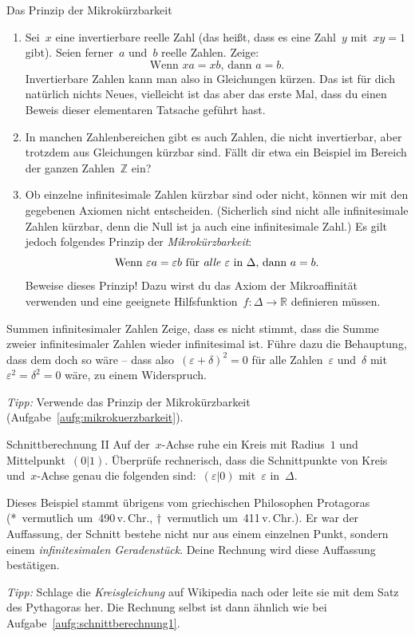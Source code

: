 \documentclass{zirkelblatt}
\newcommand{\ZZ}{\mathbb{Z}}
\newcommand{\RR}{\mathbb{R}}
\theoremstyle{definition}
\theoremstyle{plain}
\theoremstyle{remark}
\begin{document}
\begin{aufgabeShaded}{Das Prinzip der Mikrokürzbarkeit}
\label{aufg:mikrokuerzbarkeit}
\begin{enumerate}
\item Sei~$x$ eine invertierbare reelle Zahl (das heißt, dass es eine Zahl~$y$
mit~$xy = 1$ gibt). Seien ferner~$a$ und~$b$ reelle Zahlen. Zeige:
\[ \text{Wenn $xa = xb$, dann $a = b$.} \]
Invertierbare Zahlen kann man also in Gleichungen kürzen. Das ist für dich
natürlich nichts Neues, vielleicht ist das aber das erste Mal, dass du einen
Beweis dieser elementaren Tatsache geführt hast.

\item In manchen Zahlenbereichen gibt es auch Zahlen, die nicht invertierbar,
aber trotzdem aus Gleichungen kürzbar sind. Fällt dir etwa ein Beispiel im
Bereich der ganzen Zahlen~$\ZZ$ ein?

\item Ob einzelne infinitesimale Zahlen kürzbar sind oder nicht, können wir mit
den gegebenen Axiomen nicht entscheiden. (Sicherlich sind nicht alle
infinitesimale Zahlen kürzbar, denn die Null ist ja auch eine infinitesimale
Zahl.) Es gilt jedoch folgendes Prinzip der \emph{Mikrokürzbarkeit}:
\[ \text{Wenn~$\varepsilon a = \varepsilon b$ für \emph{alle} $\varepsilon$
in~$\Delta$, dann $a = b$.} \]
Beweise dieses Prinzip! Dazu wirst du das Axiom der Mikroaffinität verwenden
und eine geeignete Hilfsfunktion~$f : \Delta \to \RR$ definieren müssen.
\end{enumerate}
\end{aufgabeShaded}

\newpage
\begin{aufgabeShaded}{Summen infinitesimaler Zahlen}
Zeige, dass es nicht stimmt, dass die Summe zweier infinitesimaler Zahlen
wieder infinitesimal ist. Führe dazu die Behauptung, dass dem doch so wäre --
dass also~$(\varepsilon + \delta)^2 = 0$ für alle Zahlen~$\varepsilon$
und~$\delta$ mit~$\varepsilon^2 = \delta^2 = 0$ wäre, zu einem Widerspruch.

\emph{Tipp:} Verwende das Prinzip der Mikrokürzbarkeit
(Aufgabe~\ref{aufg:mikrokuerzbarkeit}).
\end{aufgabeShaded}

\begin{aufgabeShaded}{Schnittberechnung II}
Auf der~$x$-Achse ruhe ein Kreis mit Radius~$1$ und Mittelpunkt~$(0|1)$.
Überprüfe rechnerisch, dass die Schnittpunkte von Kreis und~$x$-Achse genau die
folgenden sind:~$(\varepsilon|0)$ mit~$\varepsilon$ in~$\Delta$.

Dieses Beispiel stammt übrigens vom griechischen Philosophen Protagoras
(*~vermutlich um~490\,v.\,Chr., †~vermutlich um~411\,v.\,Chr.). Er
war der Auffassung, der Schnitt bestehe nicht nur aus einem einzelnen Punkt,
sondern einem \emph{infinitesimalen Geradenstück}. Deine Rechnung wird diese
Auffassung bestätigen.

\emph{Tipp:} Schlage die \emph{Kreisgleichung} auf Wikipedia nach oder leite
sie mit dem Satz des Pythagoras her. Die Rechnung selbst ist dann ähnlich wie
bei Aufgabe~\ref{aufg:schnittberechnung1}.
\end{aufgabeShaded}
\end{document}
